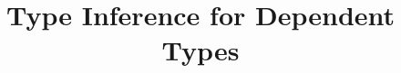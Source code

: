 \documentclass[acmlarge, dvipsnames]{acmart}
\begin{document}
\title{Type Inference for Dependent Types}




\end{document}
